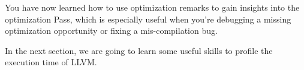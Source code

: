 You have now learned how to use optimization remarks to gain insights into the optimization Pass, which is especially useful when you're debugging a missing optimization opportunity or fixing a mis-compilation bug.

In the next section, we are going to learn some useful skills to profile the execution time of LLVM.





















